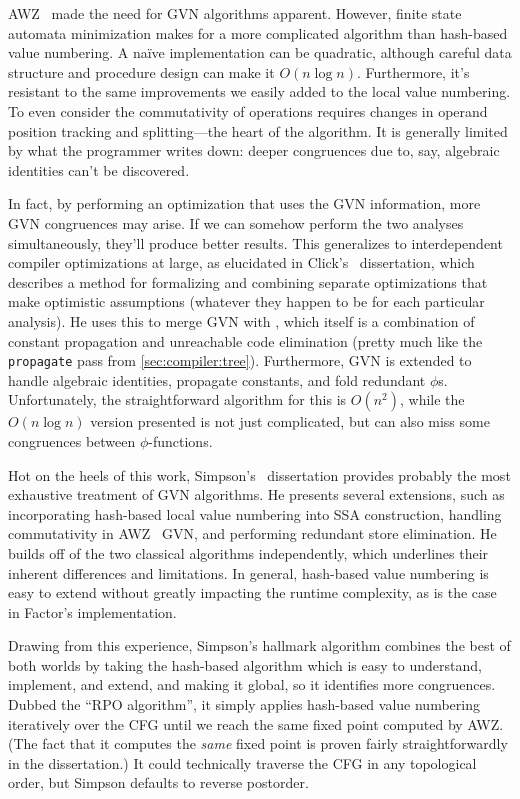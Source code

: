 AWZ~ made the need for \gls{GVN} algorithms apparent.  However,
finite state automata minimization makes for a more complicated algorithm than
hash-based value numbering.  A na\"{i}ve implementation can be quadratic,
although careful data structure and procedure design can make it $O(n\log n)$.
Furthermore, it's resistant to the same improvements we easily added to the
local value numbering.  To even consider the commutativity of operations
requires changes in operand position tracking and splitting---the heart of the
algorithm.  It is generally limited by what the programmer writes down: deeper
congruences due to, say, algebraic identities can't be discovered.

In fact, by performing an optimization that uses the \gls{GVN} information,
more \gls{GVN} congruences may arise.  If we can somehow perform the two
analyses simultaneously, they'll produce better results.  This generalizes to
interdependent compiler optimizations at large, as elucidated in
Click's~ dissertation, which describes a method for formalizing
and combining separate optimizations that make optimistic assumptions (whatever
they happen to be for each particular analysis).  He uses this to merge
\gls{GVN} with , which itself is a
combination of constant propagation and unreachable code elimination (pretty
much like the \Verb|propagate| pass from \cref{sec:compiler:tree}).
Furthermore, \gls{GVN} is extended to handle algebraic identities, propagate
constants, and fold redundant $\phi$s.  Unfortunately, the straightforward
algorithm for this is $O(n^2)$, while the $O(n\log n)$ version presented is not
just complicated, but can also miss some congruences between
$\phi$-functions.

Hot on the heels of this work, Simpson's~ dissertation provides
probably the most exhaustive treatment of \gls{GVN} algorithms.  He presents
several extensions, such as incorporating hash-based local value numbering into
\gls{SSA} construction, handling commutativity in AWZ~ \gls{GVN},
and performing redundant store elimination.  He builds off of the two classical
algorithms independently, which underlines their inherent differences and
limitations.  In general, hash-based value numbering is easy to extend without
greatly impacting the runtime complexity, as is the case in Factor's
implementation.

Drawing from this experience, Simpson's hallmark algorithm combines the best of
both worlds by taking the hash-based algorithm which is easy to understand,
implement, and extend, and making it global, so it identifies more congruences.
Dubbed the ``\gls{RPO} algorithm'', it simply applies hash-based value
numbering iteratively over the \gls{CFG} until we reach the same fixed point
computed by AWZ.  (The fact that it computes the \emph{same} fixed
point is proven fairly straightforwardly in the dissertation.)  It could
technically traverse the \gls{CFG} in any topological order, but Simpson
defaults to reverse postorder.

